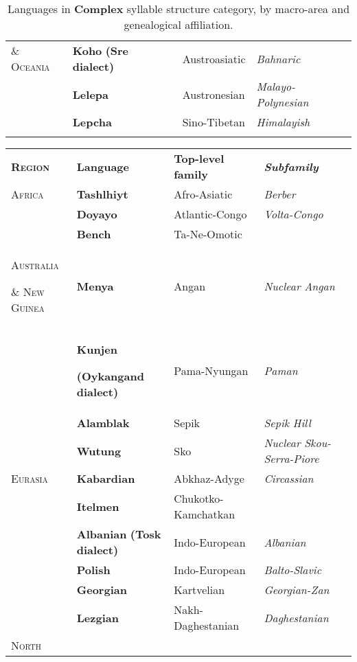\begin{table}
\begin{tabularx}{\textwidth}{XXXX}
\textsc{\&} \textsc{Oceania} & \textbf{Koho} \textbf{(Sre} \textbf{dialect)} & Austroasiatic & \textit{Bahnaric}\\
\hhline{-~~~} & \textbf{Lelepa} & Austronesian & \textit{Malayo-Polynesian}\\
& \textbf{Lepcha} & Sino-Tibetan & \textit{Himalayish}\\
\hhline{~---}
\lspbottomrule
\end{tabularx}
\caption{\label{2.6}Languages in \textbf{Complex} syllable structure category, by macro-area and genealogical affiliation.}
\end{table}







\begin{table}
\begin{tabularx}{\textwidth}{XXXX}
\lsptoprule

\textbf{\textsc{Region}} & \textbf{Language} & \textbf{Top-level} \textbf{family} & \textbf{\textit{Subfamily}}\\
\textsc{Africa} & \textbf{Tashlhiyt} & Afro-Asiatic & \textit{Berber}\\
\hhline{-~~~} & \textbf{Doyayo} & Atlantic-Congo & \textit{Volta-Congo}\\
& \textbf{Bench} & Ta-Ne-Omotic & \\
\textsc{Australia} 

\textsc{\&} \textsc{New} \textsc{Guinea} & \textbf{Menya} & Angan & \textit{Nuclear} \textit{Angan}\\
\hhline{-~~~} & \textbf{Kunjen} 

\textbf{(Oykangand} \textbf{dialect)} & Pama-Nyungan & \textit{Paman}\\
& \textbf{Alamblak} & Sepik & \textit{Sepik} \textit{Hill}\\
& \textbf{Wutung} & Sko & \textit{Nuclear} \textit{Skou-Serra-Piore}\\
\textsc{Eurasia} & \textbf{Kabardian} & Abkhaz-Adyge & \textit{Circassian}\\
\hhline{-~~~} & \textbf{Itelmen} & Chukotko-Kamchatkan & \\
& \textbf{Albanian} \textbf{(Tosk} \textbf{dialect)} & Indo-European & \textit{Albanian}\\
& \textbf{Polish} & Indo-European & \textit{Balto-Slavic}\\
& \textbf{Georgian} & Kartvelian & \textit{Georgian-Zan}\\
& \textbf{Lezgian} & Nakh-Daghestanian & \textit{Daghestanian}\\
\textsc{North} 


\end{tabularx}
\end{table}
